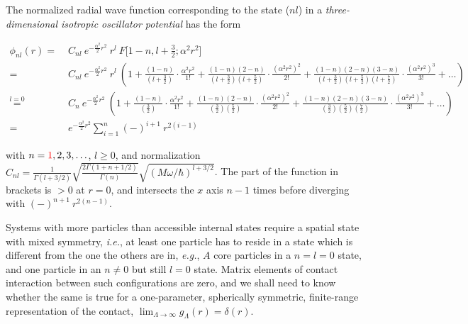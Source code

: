 \documentclass
[aps,nofootinbib,prl,showpacs,twocolumn,groupedaddress,superscriptaddress]
{revtex4}
\newcommand{\red}[1]{\textcolor{red}{#1}}
\newcommand{\eg}{\textit{e.g.}\;}
\newcommand{\ie}{\textit{i.e.}\;}
\begin{document}
The normalized radial wave function corresponding to the state ($nl$) in a 
{\it three-dimensional isotropic oscillator potential} has the form
\begin{widetext}
\begin{align*}
\phi_{nl}(r)=&\;C_{nl}~e^{-\frac{\alpha^2}{2}r^2}~r^l~F\big[1-n,l+\frac{3}{2};\alpha^2r^2\big]\\
=&\;C_{nl}~e^{-\frac{\alpha^2}{2}r^2}~r^l~
\left(1+\frac{(1-n)}{(l+\frac{3}{2})}\cdot\frac{\alpha^2r^2}{1!}
+\frac{(1-n)(2-n)}{(l+\frac{3}{2})(l+\frac{5}{2})}\cdot\frac{(\alpha^2r^2)^2}{2!}
+\frac{(1-n)(2-n)(3-n)}{(l+\frac{3}{2})(l+\frac{5}{2})(l+\frac{7}{2})}\cdot\frac{(\alpha^2r^2)^3}{3!}+\ldots\right)\\
\stackrel{l=0}{=}&\;C_{n}~e^{-\frac{\alpha^2}{2}r^2}~
\left(1+\frac{(1-n)}{(\frac{3}{2})}\cdot\frac{\alpha^2r^2}{1!}
+\frac{(1-n)(2-n)}{(\frac{3}{2})(\frac{5}{2})}\cdot\frac{(\alpha^2r^2)^2}{2!}
+\frac{(1-n)(2-n)(3-n)}{(\frac{3}{2})(\frac{5}{2})(\frac{7}{2})}\cdot\frac{(\alpha^2r^2)^3}{3!}+\ldots\right)\\
=&\;e^{-\frac{\alpha^2}{2}r^2}\sum_{i=1}^n(-)^{i+1}~r^{2(i-1)}
\end{align*}
\end{widetext}
with $n=\red{1},2,3,\ldots$, $l\geq 0$, and normalization $C_{nl}=\frac{1}{\Gamma(l+3/2)}\sqrt{\frac{2\Gamma(1+n+1/2)}{\Gamma(n)}}\sqrt{(M\omega/\hbar)^{l+3/2}}$. The part of the function in brackets
is $>0$ at $r=0$, and intersects the $x$ axis $n-1$ times before diverging with $(-)^{n+1}~r^{2(n-1)}$.

Systems with more particles than accessible internal states require a spatial state with mixed symmetry, \ie, at least one
particle has to reside in a state which is different from the one the others are in, \eg, $A$ core particles in a
$n=l=0$ state, and one particle in an $n\neq0$ but still $l=0$ state. Matrix elements of contact interaction between
such configurations are zero, and we shall need to know whether the same is true for a one-parameter, spherically symmetric,
finite-range representation of the contact, $\lim_{\Lambda\to\infty}g_\Lambda(r)=\delta(r)$. 
\end{document}
